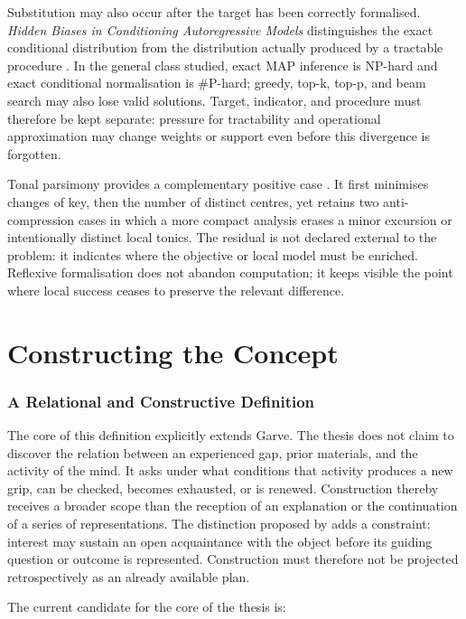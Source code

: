 \documentclass[11pt,a4paper]{article}
\begin{document}
Substitution may also occur after the target has been correctly formalised.
\emph{Hidden Biases in Conditioning Autoregressive Models} distinguishes the
exact conditional distribution from the distribution actually produced by a
tractable procedure \parencite{pachet2026biases}. In the general class studied,
exact MAP inference is NP-hard and exact conditional normalisation is
\#P-hard; greedy, top-k, top-p, and beam search may also lose valid solutions.
Target, indicator, and procedure must therefore be kept separate: pressure for
tractability and operational approximation may change weights or support even
before this divergence is forgotten.

Tonal parsimony provides a complementary positive case
\parencite{pachet2026tonalparsimony}. It first minimises changes of key, then the
number of distinct centres, yet retains two anti-compression cases in which a
more compact analysis erases a minor excursion or intentionally distinct local
tonics. The residual is not declared external to the problem: it indicates
where the objective or local model must be enriched. Reflexive formalisation
does not abandon computation; it keeps visible the point where local success
ceases to preserve the relevant difference.

\part{Constructing the Concept}

\section{A Relational and Constructive Definition}

The core of this definition explicitly extends Garve. The thesis does not claim
to discover the relation between an experienced gap, prior materials, and the
activity of the mind. It asks under what conditions that activity produces a
new grip, can be checked, becomes exhausted, or is renewed. Construction thereby
receives a broader scope than the reception of an explanation or the
continuation of a series of representations.
The distinction proposed by \textcite{vazard2026inquiry} adds a constraint:
interest may sustain an open acquaintance with the object before its guiding
question or outcome is represented. Construction must therefore not be
projected retrospectively as an already available plan.

The current candidate for the core of the thesis is:
\end{document}
